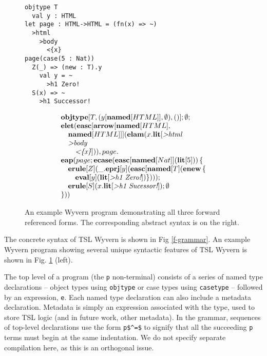 \begin{figure}[t]
\begin{minipage}[t]{.50\textwidth}
\begin{lstlisting}
objtype T
  val y : HTML
let page : HTML->HTML = (fn(x) => ~)
  >html
    >body
      <{x}
page(case(5 : Nat))
  Z(_) => (new : T).y
    val y = ~
      >h1 Zero!
  S(x) => ~
    >h1 Successor!
\end{lstlisting}
\end{minipage}%
\begin{minipage}[t]{.45\textwidth}
\vspace{-5pt}\[\begin{array}{l}
\textbf{objtype}[T, (y[\textbf{named}[HTML]], \emptyset), 
  ()]; \emptyset;\\
\textbf{elet}(\textbf{easc}[\textbf{arrow}[\textbf{named}[HTML], \\
\quad \textbf{named}[HTML]]](\textbf{elam}(x.\textbf{lit}[\textit{>html}\\
\quad \textit{>body}\\
\quad\quad \textit{<\{x\}}])), page.\\
\textbf{eap}(page; \textbf{ecase}(\textbf{easc}[\textbf{named}[Nat]](\textbf{lit}[5]))\,\{\\
\quad \textbf{erule}[Z](\_.\textbf{eprj}[y](\textbf{easc}[\textbf{named}[T](\textbf{enew}\,\{\\
\quad\quad \textbf{eval}[y](\textbf{lit}[\textit{>h1 Zero!}])\})));\\
\quad \textbf{erule}[S](x.\textbf{lit}[\textit{>h1 Sucessor!}]); \emptyset\\
\}))\end{array}
\]
\end{minipage}
\caption{An example Wyvern program demonstrating all three forward referenced forms. The corresponding abstract syntax is on the right.}
\label{fig:fwd-ref}
\end{figure}
The concrete syntax of TSL Wyvern is shown in Fig \ref{f-grammar}. An example Wyvern program showing several unique syntactic features of TSL Wyvern is shown in Fig. \ref{fig:fwd-ref} (left). 

The top level of a program (the \lstinline{p} non-terminal) consists of a series of named type declarations -- object types using \lstinline{objtype} or case types using \lstinline{casetype} -- followed by an expression, \lstinline{e}. Each named type declaration can also include a metadata declaration. Metadata is simply an expression associated with the type, used to store TSL logic (and in future work, other metadata). In the grammar, sequences of top-level declarations use the form \lstinline{p$^=$} to signify that all the succeeding \lstinline{p} terms must begin at the same indentation. We do not specify separate compilation here, as this is an orthogonal issue.

